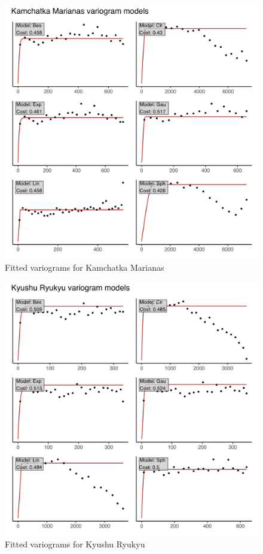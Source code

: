 \begin{figure}
\centering
\includegraphics{assets/figs/chpt3/KamchatkaMarianasVgrms.png}
\caption[Fitted variograms for Kamchatka Marianas]{Fitted variograms for Kamchatka Marianas}
\end{figure}

\begin{figure}
\centering
\includegraphics{assets/figs/chpt3/KyushuRyukyuVgrms.png}
\caption[Fitted variograms for Kyushu Ryukyu]{Fitted variograms for Kyushu Ryukyu}
\end{figure}

